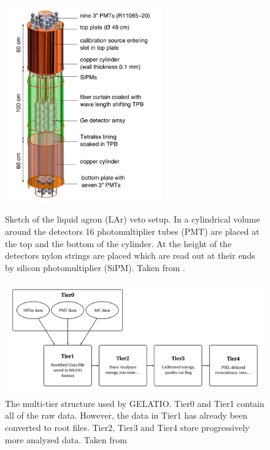 \documentclass[encoding=utf8,british]{tumphthesis}
\begin{document}
\begin{figure}[t!]
	\centering
	\begin{minipage}{.45\textwidth}
		\centering
		\includegraphics[width=0.6\textwidth]{./Bilder/LArVetoSetup.png}
		\caption{Sketch of the liquid agron (LAr) veto setup. In a cylindrical volume around the detectors 16 photomultiplier tubes (PMT) are placed at the top and the bottom of the cylinder. At the height of the detectors nylon strings are placed which are read out at their ends by silicon photomultiplier (SiPM). Taken from \cite{collaboration_upgrade_2018}.}
		\label{fig:LArVetoSetup}
	\end{minipage}\hfill%
	\begin{minipage}{.5\textwidth}
		\centering
		\includegraphics[width=\textwidth]{./Bilder/TierStructure.png}
		\caption{The multi-tier structure used by GELATIO. Tier0 and Tier1 contain all of the raw data. However, the data in Tier1 has already been converted to root files. Tier2, Tier3 and Tier4 store  progressively more analyzed data. Taken from \cite{agostini_gelatio:_2011}}
		\label{fig:TierStructure}
	\end{minipage}
\end{figure}
\end{document}
